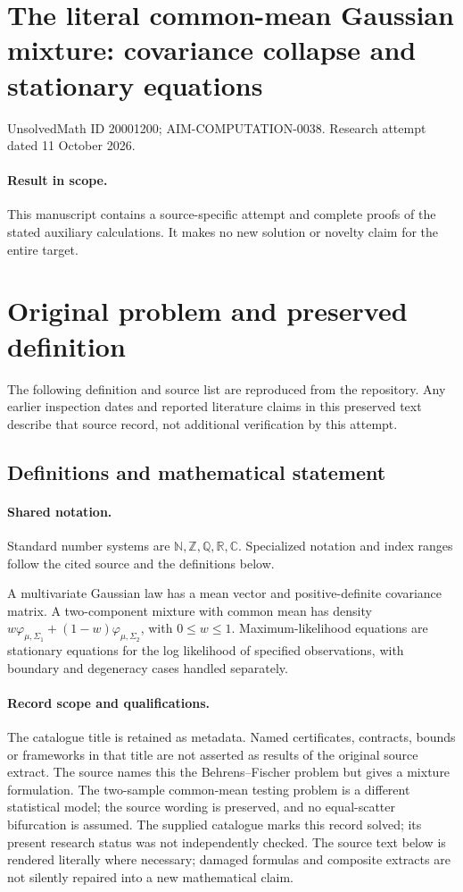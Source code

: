 \documentclass[11pt]{article}
\begin{document}
\section*{The literal common-mean Gaussian mixture: covariance collapse and stationary equations}
\noindent UnsolvedMath ID 20001200; AIM-COMPUTATION-0038. Research attempt dated 11 October 2026.
\paragraph{Result in scope.}This manuscript contains a source-specific attempt and complete proofs of the stated auxiliary calculations. It makes no new solution or novelty claim for the entire target.
\section{Original problem and preserved definition}
The following definition and source list are reproduced from the repository. Any earlier inspection dates and reported literature claims in this preserved text describe that source record, not additional verification by this attempt.
\subsection{Definitions and mathematical statement}

\paragraph{Shared notation.}Standard number systems are $\mathbb N,\mathbb Z,\mathbb Q,\mathbb R,\mathbb C$. Specialized notation and index ranges follow the cited source and the definitions below.


A multivariate Gaussian law has a mean vector and positive-definite covariance matrix. A two-component mixture with common mean has density $w\varphi_{\mu,\Sigma_1}+(1-w)\varphi_{\mu,\Sigma_2}$, with $0\leq w\leq1$. Maximum-likelihood equations are stationary equations for the log likelihood of specified observations, with boundary and degeneracy cases handled separately.
\paragraph{Record scope and qualifications.}
The catalogue title is retained as metadata. Named certificates, contracts, bounds or frameworks in that title are not asserted as results of the original source extract.
The source names this the Behrens--Fischer problem but gives a mixture formulation. The two-sample common-mean testing problem is a different statistical model; the source wording is preserved, and no equal-scatter bifurcation is assumed. The supplied catalogue marks this record solved; its present research status was not independently checked.
The source text below is rendered literally where necessary; damaged formulas and composite extracts are not silently repaired into a new mathematical claim.
\end{document}
